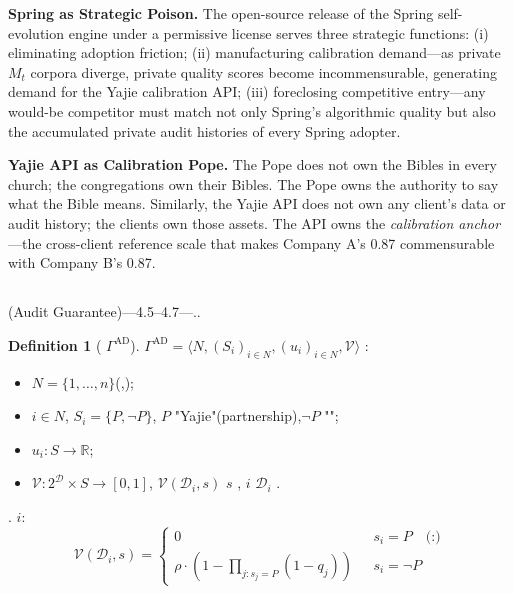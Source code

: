 \documentclass[12pt,a4paper]{article}
\theoremstyle{definition}
\newtheorem{definition}{Definition}[section]
\theoremstyle{remark}
\begin{document}
\textbf{Spring as Strategic Poison.} The open-source release of the Spring self-evolution engine under a permissive license serves three strategic functions: (i) eliminating adoption friction; (ii) manufacturing calibration demand—as private $M_t$ corpora diverge, private quality scores become incommensurable, generating demand for the Yajie calibration API; (iii) foreclosing competitive entry—any would-be competitor must match not only Spring's algorithmic quality but also the accumulated private audit histories of every Spring adopter.

\textbf{Yajie API as Calibration Pope.} The Pope does not own the Bibles in every church; the congregations own their Bibles. The Pope owns the authority to say what the Bible means. Similarly, the Yajie API does not own any client's data or audit history; the clients own those assets. The API owns the \textit{calibration anchor}—the cross-client reference scale that makes Company A's 0.87 commensurable with Company B's 0.87.

\subsection{}

(Audit Guarantee)---4.5--4.7---..

\begin{definition}[ $\Gamma^{\text{AD}}$]
\label{def:audit-deterrence-game}
 $\Gamma^{\text{AD}} = \langle N, (S_i)_{i \in N}, (u_i)_{i \in N}, \mathcal{V} \rangle$ :
\begin{itemize}[itemsep=2pt]
\item  $N = \{1, \ldots, n\}$(,);
\item  $i \in N$, $S_i = \{P, \neg P\}$, $P$ "Yajie"(partnership),$\neg P$ "";
\item  $u_i: S \to \mathbb{R}$;
\item \textbf{} $\mathcal{V}: 2^{\mathcal{D}} \times S \to [0,1]$, $\mathcal{V}(\mathcal{D}_i, s)$  $s$ , $i$  $\mathcal{D}_i$ .
\end{itemize}
\end{definition}

. $i$:
\begin{equation}
\mathcal{V}(\mathcal{D}_i, s) =
\begin{cases}
0 & \text{ } s_i = P \quad \text{(:)}\\
\rho \cdot \left(1 - \prod_{j: s_j = P} (1 - q_j)\right) & \text{ } s_i = \neg P
\end{cases}
\label{eq:audit-function}
\end{equation}
\end{document}
